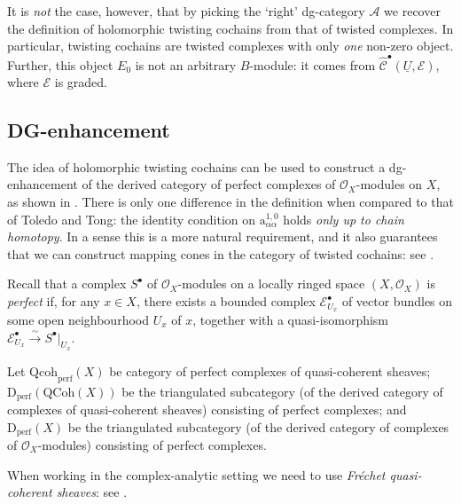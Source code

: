 \documentclass[11pt,notitlepage]{article}
\numberwithin{equation}{subsection}
\newcommand{\congto}{\xrightarrow{\sim}}
\renewcommand{\C}{\mathscr{C}}
\begin{document}
                It is \emph{not} the case, however, that by picking the `right' dg-category $\mathcal{A}$ we recover the definition of holomorphic twisting cochains from that of twisted complexes.
                In particular, twisting cochains are twisted complexes with only \emph{one} non-zero object.
                Further, this object $E_0$ is not an arbitrary $B$-module: it comes from $\hat{\C}^\bullet(\underline{U},\mathcal{E})$, where $\mathcal{E}$ is graded.

            \subsection{DG-enhancement}\label{sub:dg-categories-from-wei}

                The idea of holomorphic twisting cochains can be used to construct a dg-enhancement of the derived category of perfect complexes of $\mathcal{O}_X$-modules on $X$, as shown in \cite{Wei:2016ip}.
                There is only one difference in the definition when compared to that of Toledo and Tong: the identity condition on $\mathrm{a}_{\alpha\alpha}^{1,0}$ holds \emph{only up to chain homotopy}.
                In a sense this is a more natural requirement, and it also guarantees that we can construct mapping cones in the category of twisted cochains: see \cite[Remark~2.15]{Wei:2016ip}.

                Recall that a complex $S^\bullet$ of $\mathcal{O}_X$-modules on a locally ringed space $(X,\mathcal{O}_X)$ is \emph{perfect} if, for any $x\in X$, there exists a bounded complex $\mathcal{E}_{U_x}^\bullet$ of vector bundles on some open neighbourhood $U_x$ of $x$, together with a quasi-isomorphism \mbox{$\mathcal{E}_{U_x}^\bullet\congto S^\bullet|_{U_x}$}.

                Let $\mathrm{Qcoh}_\mathrm{perf}(X)$ be category of perfect complexes of quasi-coherent sheaves; $\mathrm{D}_\mathrm{perf}(\mathrm{QCoh}(X))$ be the triangulated subcategory (of the derived category of complexes of quasi-coherent sheaves) consisting of perfect complexes; and $\mathrm{D}_\mathrm{perf}(X)$ be the triangulated subcategory (of the derived category of complexes of $\mathcal{O}_X$-modules) consisting of perfect complexes.

                \begin{note}
                    When working in the complex-analytic setting we need to use \emph{Fréchet quasi-coherent sheaves}: see \cite[Remark~6.4]{Wei:2016ip}.
                \end{note}
\end{document}
